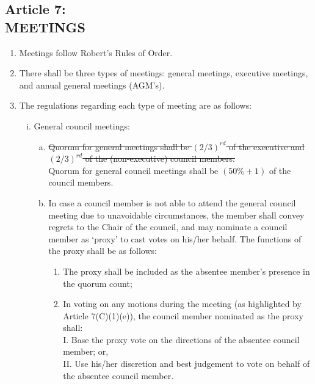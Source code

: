 \documentclass[]{report}
\begin{document}
\clearpage
\begin{center}
	\section*{Article 7:\\MEETINGS}
	\vspace{12px}
\end{center}
\label{meetings}
	\renewcommand{\theenumi}{\Alph{enumi}}
	\begin{enumerate}
		
		\item Meetings follow Robert's Rules of Order.
		\item There shall be three types of meetings: general meetings, executive meetings, and annual general meetings (AGM’s).
		\item The regulations regarding each type of meeting are as follows:
			\begin{enumerate}[i.]
				\item General council meetings:
					\begin{enumerate}[(a)]
						\item \st{Quorum for general meetings shall be $ (2/3) ^{rd}$ of the executive and $ (2/3) ^{rd}$ of the (non-executive) council members.}\color{red}\\
						Quorum for general council meetings shall be $ (50\% + 1) $ of the council members.
						\item In case a council member is not able to attend the general council meeting due to unavoidable circumstances, the member shall convey regrets to the Chair of the council, and may nominate a council member as `proxy' to cast votes on his/her behalf. The functions of the proxy shall be as follows:
							\begin{enumerate}[(1)]
								\item The proxy shall be included as the absentee member's presence in the quorum count; 
								\item In voting on any motions during the meeting (as highlighted by Article 7(C)(1)(e)), the council member nominated as the proxy shall:\\
									  I. \space Base the proxy vote on the directions of the absentee council member; or,\\
									  II. Use his/her discretion and best judgement to vote on behalf of the absentee council member.
							\end{enumerate}

\end{enumerate}
\end{enumerate}
\end{enumerate}
\end{document}
